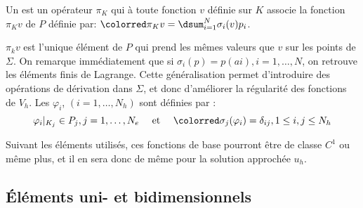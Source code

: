\medskip
\begin{definition}
Un  est un opérateur $\pi_K$
qui à toute fonction $v$ définie sur $K$ associe la fonction $\pi_Kv$ de $P$ définie par:
$\colorred\pi_Kv=\dsum_{i=1}^N \sigma_i(v)p_i$.
\end{definition}
\medskip
$\pi_kv$ est l'unique élément de $P$ qui prend les mêmes valeurs que $v$ sur les
points de $\Sigma$.
\medskip
On remarque immédiatement que si $\sigma_i(p) = p(ai), i=1,\ldots, N$, on retrouve les éléments finis
de Lagrange.
Cette généralisation permet d'introduire des opérations de dérivation dans $\Sigma$,
et donc d'améliorer la régularité des fonctions de $V_h$.
\medskip
Les  $\varphi_i$, $(i=1,\ldots, N_h)$ sont
définies par :
\begin{equation}
\varphi_i|_{K_j} \in P_j, j=1,\ldots, N_e \quad \text{ et } \quad \colorred
\sigma_j(\varphi_i)=\delta_{ij}, 1\le i,j\le N_h
\end{equation}

Suivant les éléments utilisés, ces fonctions de base pourront être de classe $C^1$
ou même plus, et il en sera donc de même pour la solution approchée $u_h$.


\medskip
\subsection{Éléments uni- et bidimensionnels}

